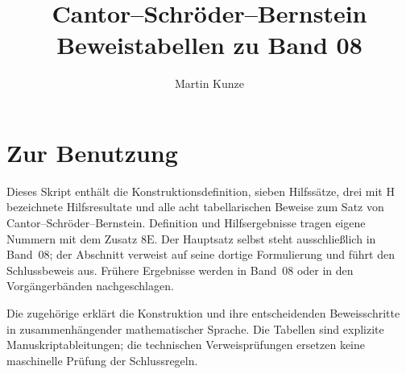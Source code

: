 \documentclass[main.tex]{subfiles}
\title{Cantor--Schröder--Bernstein\\[.5em]\large Beweistabellen zu Band 08}
\author{Martin Kunze}
\date{}
\begin{document}
\hypersetup{pageanchor=false}
\maketitle
\hypersetup{pageanchor=true,hypertexnames=false}
\hypertarget{csb.proofs}{}
\chapter*{Zur Benutzung}
Dieses Skript enthält die Konstruktionsdefinition, sieben Hilfssätze,
drei mit H bezeichnete Hilfsresultate und alle acht tabellarischen
Beweise zum Satz von Cantor--Schröder--Bernstein.
Definition und Hilfsergebnisse tragen eigene Nummern mit dem Zusatz
\(8\mathrm{E}\). Der Hauptsatz selbst steht ausschließlich in Band~08;
der Abschnitt \CSBMainProofLink{} verweist auf seine dortige Formulierung
und führt den Schlussbeweis aus. Frühere Ergebnisse werden in Band~08
oder in den Vorgängerbänden nachgeschlagen.

Die zugehörige \CSBReadingLink{} erklärt die Konstruktion und ihre
entscheidenden Beweisschritte in zusammenhängender mathematischer Sprache.
Die Tabellen sind explizite Manuskriptableitungen; die technischen
Verweisprüfungen ersetzen keine maschinelle Prüfung der Schlussregeln.

\ProofWideReasonsNearFormula

\end{document}
